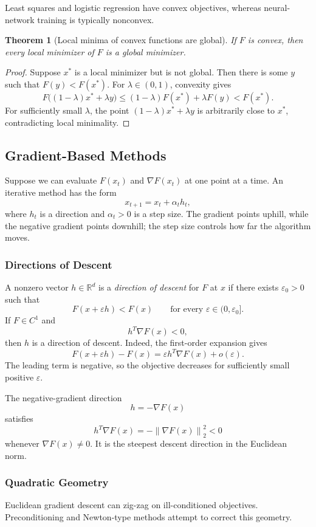 \documentclass[12pt,oneside]{book}
\numberwithin{equation}{section}
\theoremstyle{definition}
\theoremstyle{plain}
\newtheorem{theorem}{Theorem}[section]
\theoremstyle{remark}
\newcommand{\R}{\mathbb{R}}
\newcommand{\norm}[1]{\left\lVert #1 \right\rVert}
\begin{document}
Least squares and logistic regression have convex objectives, whereas neural-network training is typically nonconvex.

\begin{theorem}[Local minima of convex functions are global]
If $F$ is convex, then every local minimizer of $F$ is a global minimizer.
\end{theorem}

\begin{proof}
Suppose $x^*$ is a local minimizer but is not global. Then there is some $y$ such that $F(y)<F(x^*)$. For $\lambda\in(0,1)$, convexity gives
\[
F\bigl((1-\lambda)x^*+\lambda y\bigr)
\leq(1-\lambda)F(x^*)+\lambda F(y)
<F(x^*).
\]
For sufficiently small $\lambda$, the point $(1-\lambda)x^*+\lambda y$ is arbitrarily close to $x^*$, contradicting local minimality.
\end{proof}

\subsection{Gradient-Based Methods}
Suppose we can evaluate $F(x_t)$ and $\nabla F(x_t)$ at one point at a time. An iterative method has the form
\[
x_{t+1}=x_t+\alpha_t h_t,
\]
where $h_t$ is a direction and $\alpha_t>0$ is a step size. The gradient points uphill, while the negative gradient points downhill; the step size controls how far the algorithm moves.

\subsubsection{Directions of Descent}
A nonzero vector $h\in\R^d$ is a \emph{direction of descent} for $F$ at $x$ if there exists $\varepsilon_0>0$ such that
\[
F(x+\varepsilon h)<F(x)
\qquad\text{for every }\varepsilon\in(0,\varepsilon_0].
\]
If $F\in C^1$ and
\[
h^T\nabla F(x)<0,
\]
then $h$ is a direction of descent. Indeed, the first-order expansion gives
\[
F(x+\varepsilon h)-F(x)
=\varepsilon h^T\nabla F(x)+o(\varepsilon).
\]
The leading term is negative, so the objective decreases for sufficiently small positive $\varepsilon$.

The negative-gradient direction
\[
h=-\nabla F(x)
\]
satisfies
\[
h^T\nabla F(x)=-\norm{\nabla F(x)}_2^2<0
\]
whenever $\nabla F(x)\neq0$. It is the steepest descent direction in the Euclidean norm.

\subsubsection{Quadratic Geometry}
Euclidean gradient descent can zig-zag on ill-conditioned objectives. Preconditioning and Newton-type methods attempt to correct this geometry.
\end{document}
